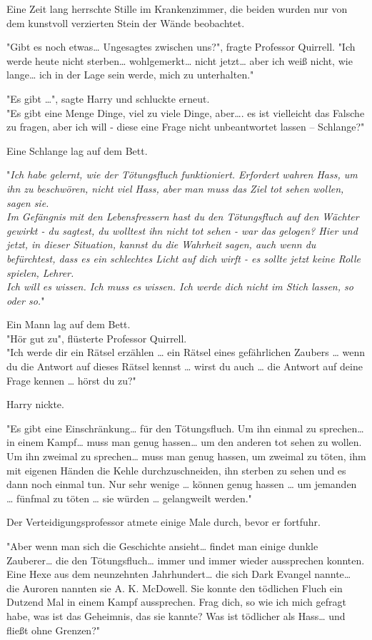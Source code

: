 {Eine Zeit lang herrschte Stille im Krankenzimmer, die beiden wurden nur von dem kunstvoll verzierten Stein der Wände beobachtet.

"Gibt es noch etwas… Ungesagtes zwischen uns?", fragte Professor Quirrell. "Ich werde heute nicht sterben… wohlgemerkt… nicht jetzt… aber ich weiß nicht, wie lange… ich in der Lage sein werde, mich zu unterhalten."

"Es gibt …", sagte Harry und schluckte erneut.\\ "Es gibt eine Menge Dinge, viel zu viele Dinge, aber…. es ist vielleicht das Falsche zu fragen, aber ich will - diese eine Frage nicht unbeantwortet lassen -- Schlange?"

Eine Schlange lag auf dem Bett.

"\emph{Ich habe gelernt, wie der Tötungsfluch funktioniert. Erfordert wahren Hass, um ihn zu beschwören, nicht viel Hass, aber man muss das Ziel tot sehen wollen, sagen sie.\\ Im Gefängnis mit den Lebensfressern hast du den Tötungsfluch auf den Wächter gewirkt - du sagtest, du wolltest ihn nicht tot sehen - war das gelogen? Hier und jetzt, in dieser Situation, kannst du die Wahrheit sagen, auch wenn du befürchtest, dass es ein schlechtes Licht auf dich wirft - es sollte jetzt keine Rolle spielen, Lehrer.\\ Ich will es wissen. Ich muss es wissen. Ich werde dich nicht im Stich lassen, so oder so.}"

Ein Mann lag auf dem Bett.\\ "Hör gut zu", flüsterte Professor Quirrell.\\ "Ich werde dir ein Rätsel erzählen … ein Rätsel eines gefährlichen Zaubers … wenn du die Antwort auf dieses Rätsel kennst … wirst du auch … die Antwort auf deine Frage kennen … hörst du zu?"

Harry nickte.

"Es gibt eine Einschränkung… für den Tötungsfluch. Um ihn einmal zu sprechen… in einem Kampf… muss man genug hassen… um den anderen tot sehen zu wollen. Um ihn zweimal zu sprechen… muss man genug hassen, um zweimal zu töten, ihm mit eigenen Händen die Kehle durchzuschneiden, ihn sterben zu sehen und es dann noch einmal tun. Nur sehr wenige … können genug hassen … um jemanden … fünfmal zu töten … sie würden … gelangweilt werden."

Der Verteidigungsprofessor atmete einige Male durch, bevor er fortfuhr.

"Aber wenn man sich die Geschichte ansieht… findet man einige dunkle Zauberer… die den Tötungsfluch… immer und immer wieder aussprechen konnten. Eine Hexe aus dem neunzehnten Jahrhundert… die sich Dark Evangel nannte… die Auroren nannten sie A. K. McDowell. Sie konnte den tödlichen Fluch ein Dutzend Mal in einem Kampf aussprechen. Frag dich, so wie ich mich gefragt habe, was ist das Geheimnis, das sie kannte? Was ist tödlicher als Hass… und fließt ohne Grenzen?"

}
